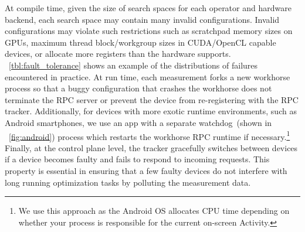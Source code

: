 At compile time, given the size of search spaces for each operator and hardware backend, each search space may contain many invalid configurations.
Invalid configurations may violate such restrictions such as scratchpad memory sizes on GPUs, maximum thread block/workgroup sizes in CUDA/OpenCL capable devices, or allocate more registers than the hardware supports.
 ~\autoref{tbl:fault_tolerance} shows an example of the distributions of failures encountered in practice.
At run time, each measurement forks a new workhorse process so that a buggy configuration that crashes the workhorse does not terminate the RPC server or prevent the device from re-registering with the RPC tracker.
Additionally, for devices with more exotic runtime environments, such as Android smartphones, we use an app with a separate watchdog~(shown in ~\autoref{fig:android}) process which restarts the workhorse RPC runtime if necessary.\footnote{We use this approach as the Android OS allocates CPU time depending on whether your process is responsible for the current on-screen Activity.}
Finally, at the control plane level, the tracker gracefully switches between devices if a device becomes faulty and fails to respond to incoming requests.
This property is essential in ensuring that a few faulty devices do not interfere with long running optimization tasks by polluting the measurement data.



